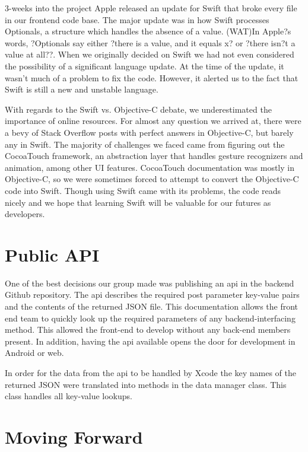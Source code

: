 \documentclass[12pt]{article}
\begin{document}
3-weeks into the project Apple released an update for Swift that broke every file in our frontend code base. 
The major update was in how Swift processes Optionals, a structure which handles the absence of a value. 
(WAT)In Apple?s words, ?Optionals say either ?there is a value, and it equals x? or ?there isn?t a value at all??. 
When we originally decided on Swift we had not even considered the possibility of a significant language update. 
At the time of the update, it wasn't much of a problem to fix the code. 
However, it alerted us to the fact that Swift is still a new and unstable language. 

\bigskip

With regards to the Swift vs. Objective-C debate, we underestimated the importance of online resources. 
For almost any question we arrived at, there were a bevy of Stack Overflow posts with perfect answers in Objective-C, but barely any in Swift. 
The majority of challenges we faced came from figuring out the CocoaTouch framework, an abstraction layer that handles gesture recognizers and animation, among other UI features. 
CocoaTouch documentation was mostly in Objective-C, so we were sometimes forced to attempt to convert the Objective-C code into Swift. 
Though using Swift came with its problems, the code reads nicely and we hope that learning Swift will be valuable for our futures as developers.

\bigskip

\section{Public API}
One of the best decisions our group made was publishing an api in the backend Github repository. 
The api describes the required post parameter key-value pairs and the contents of the returned JSON file. 
This documentation allows the front end team to quickly look up the required parameters of any backend-interfacing method. 
This allowed the front-end to develop without any back-end members present.
In addition, having the api available opens the door for development in Android or web.

In order for the data from the api to be handled by Xcode the key names of the returned JSON were translated into methods in the data manager class. This class handles all key-value lookups. 

\bigskip

\section{Moving Forward}
\end{document}
